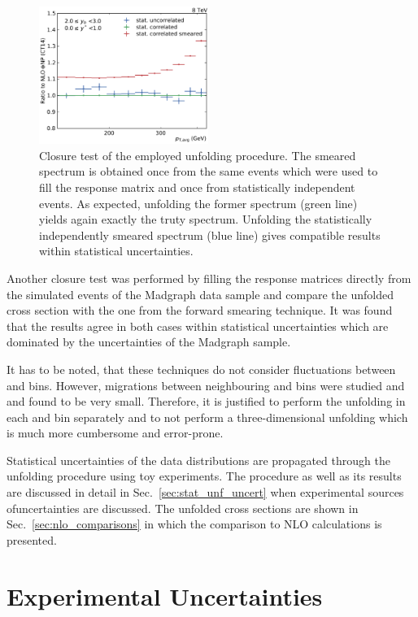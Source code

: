 \begin{figure}[htp]
    \includegraphics[width=0.49\textwidth]{figures/measurement/unf_nlo_check_yb2ys0.pdf}
    \caption[Closure check of unfolding technique]{Closure test of the employed unfolding
    procedure. The smeared spectrum is obtained once from the same events which
were used to fill the response matrix and once from statistically independent
events. As expected, unfolding the former spectrum (green line) yields again exactly the
truty spectrum. Unfolding the statistically independently smeared spectrum
(blue line) gives compatible results within statistical uncertainties.}
    \label{fig:unf_closure_test}
\end{figure}

Another closure test was performed by filling the response matrices directly
from the simulated events of the Madgraph data sample and compare the unfolded
cross section with the one from the forward smearing technique. It was found
that the results agree in both cases within statistical uncertainties which are
dominated by the uncertainties of the Madgraph sample.

It has to be noted, that these
techniques do not consider fluctuations between \ystar and \yboost bins.
However, migrations between neighbouring \ystar and \yboost bins were studied
and and found to be very small. Therefore, it is justified to perform the
unfolding in each \ystar and \yboost bin separately and to not perform a
three-dimensional unfolding which is much more cumbersome and error-prone.

Statistical uncertainties of the data distributions are propagated through the
unfolding procedure using toy experiments. The procedure as well as its results
are discussed in detail in Sec.~\ref{sec:stat_unf_uncert} when experimental
sources ofuncertainties are discussed. The unfolded cross sections are shown in
Sec.~\ref{sec:nlo_comparisons} in which the comparison to NLO calculations is
presented.

\section{Experimental Uncertainties}
\label{sec:experimental_uncertainties}

